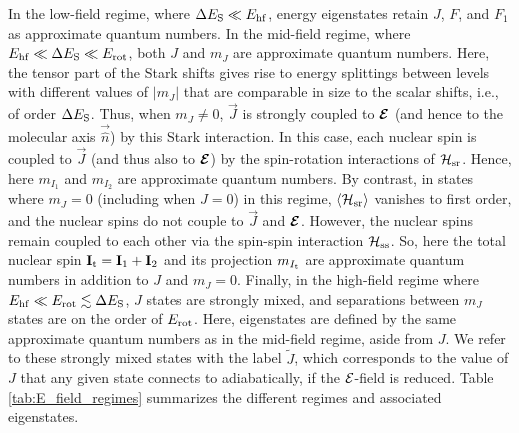 In the low-field regime, where $\Delta E_{\rm S} \ll E_{\rm hf}$, energy eigenstates retain $J$, $F$, and $F_1$ as approximate quantum numbers. 
In the mid-field regime, where $E_{\rm hf} \ll \Delta E_{\rm S} \ll E_{\rm rot}$, both $J$ and $m_J$ are approximate quantum numbers. 
Here, the tensor part of the Stark shifts gives rise to energy splittings between levels with different values of $|m_J|$ that are comparable in size to the scalar shifts, i.e., of order $\Delta E_{\rm S}$.  Thus, when $m_J\neq 0$, $\vec{J}$ is strongly coupled to $\bm{\mathcal{E}}$ (and hence to the molecular axis $\vec{\hat{n}}$) by this Stark interaction. In this case, each nuclear spin is coupled to $\vec{J}$ (and thus also to $\bm{\mathcal{E}}$) by the spin-rotation interactions of $\mathcal{H}_{\rm sr}$. Hence, here $m_{I_1}$ and $m_{I_2}$ are approximate quantum numbers. By contrast, in states where $m_J=0$ (including when $J=0$) in this regime, $\left\langle \mathcal{H}_{\rm sr}\right\rangle$ vanishes to first order, and the nuclear spins do not couple to $\vec{J}$ and $\bm{\mathcal{E}}$. However, the nuclear spins remain coupled to each other via the spin-spin interaction $\mathcal{H}_{\rm ss}$.  So, here the total nuclear spin $\mathbf{I_\text{t}} = \mathbf{I}_1 + \mathbf{I}_2$ and its projection $m_{I_\text{t}}$ are approximate quantum numbers in addition to $J$ and $m_J=0$. 
Finally, in the high-field regime where $E_{\rm hf} \ll E_{\rm rot} \lesssim \Delta E_{\rm S}$, $J$ states are strongly mixed, and separations between $m_J$ states are on the order of $E_{\rm rot}$. Here, eigenstates are defined by the same approximate quantum numbers as in the mid-field regime, aside from $J$. We refer to these strongly mixed states with the label $\widetilde{J}$, which corresponds to the value of $J$ that any given state connects to adiabatically, if the $\mathcal{E}$-field is reduced.
Table \ref{tab:E_field_regimes} summarizes the different regimes and associated eigenstates.  
